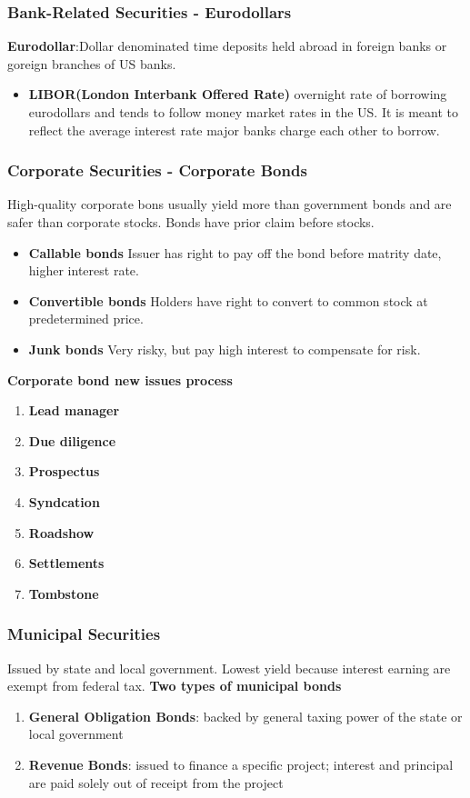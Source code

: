 \documentclass{article}
\theoremstyle{definition}
\theoremstyle{thrm}
\theoremstyle{lma}
\theoremstyle{ppst}
\theoremstyle{crlr}
\begin{document}
\subsubsection{Bank-Related Securities - Eurodollars}
\textbf{Eurodollar}:Dollar denominated time deposits held abroad in foreign banks or goreign branches of US banks.
\begin{itemize}
	\item \textbf{LIBOR(London Interbank Offered Rate)} overnight rate of borrowing eurodollars and tends to follow money market rates in the US. It is meant to reflect the average interest rate major banks charge each other to borrow. 
\end{itemize}

\subsubsection{Corporate Securities - Corporate Bonds}
High-quality corporate bons usually yield more than government bonds and are safer than corporate stocks. Bonds have prior claim before stocks.
\begin{itemize}
	\item \textbf{Callable bonds} Issuer has right to pay off the bond before matrity date, higher interest rate.
	\item \textbf{Convertible bonds} Holders have right to convert to common stock at predetermined price. 
	\item \textbf{Junk bonds} Very risky, but pay high interest to compensate for risk. 
\end{itemize}
\textbf{Corporate bond new issues process}
\begin{enumerate}
	\item \textbf{Lead manager}
	\item \textbf{Due diligence}
	\item \textbf{Prospectus}
	\item \textbf{Syndcation}
	\item \textbf{Roadshow}
	\item \textbf{Settlements}
	\item \textbf{Tombstone}
\end{enumerate}

\subsubsection{Municipal Securities}
Issued by state and local government. Lowest yield because interest earning are exempt from federal tax.
\textbf{Two types of municipal bonds}
\begin{enumerate}
	\item \textbf{General Obligation Bonds}: backed by general taxing power of the state or local government
	\item \textbf{Revenue Bonds}: issued to finance a specific project; interest and principal are paid solely out of receipt from the project
\end{enumerate}
\end{document}
